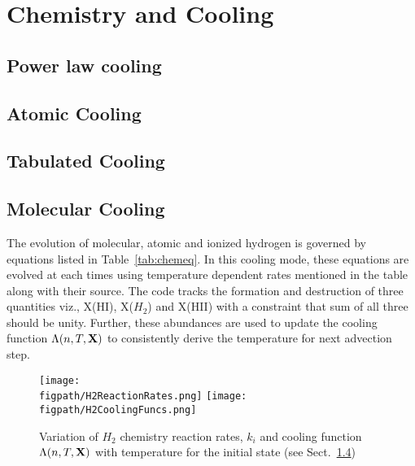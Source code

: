 \documentclass[useAMS,usenatbib,letters]{mn2e}
\newcommand{\figpath}{PFIGS/}
\begin{document}
 

\section{Chemistry and Cooling}
\label{sec:chem}
\subsection{Power law cooling}
\subsection{Atomic Cooling}
\subsection{Tabulated Cooling}


\subsection{Molecular Cooling}
\label{ssec:molcool}
The evolution of molecular, atomic and ionized hydrogen is governed by
equations listed in Table~\ref{tab:chemeq}. In this cooling mode,
these equations are evolved at each times using temperature dependent
rates mentioned in the table along with their source. The code tracks
the formation and destruction of three quantities viz., X(HI), X($H_{2}$)
and X(HII) with a constraint that sum of all three should be unity.
Further, these abundances are used to update the cooling
function $\Lambda(n,T,{\bf{X}})$ to consistently derive the
temperature for next advection step.


\begin{figure*}
 \texttt{[image: \\figpath/H2ReactionRates.png]}
 \texttt{[image: \\figpath/H2CoolingFuncs.png]}
 \caption{Variation of $H_2$ chemistry reaction rates, $k_{i}$ and cooling
   function $\Lambda(n,T,{\bf{X}})$ with temperature for the initial
   state (see Sect.~\ref{ssec:molcool})}
\label{fig:tempvar}
\end{figure*}
\end{document}
